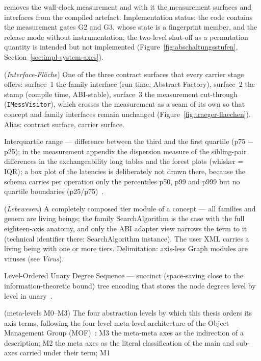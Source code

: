 \begin{description}
  removes the wall-clock measurement and with it the measurement surfaces and interfaces from the
  compiled artefact. Implementation status: the code contains the measurement gates G2 and G3,
  whose state is a fingerprint member, and the release mode without instrumentation; the two-level
  shut-off as a permutation quantity is intended but not implemented
  (Figure~\ref{fig:abschaltungsstufen}, Section~\ref{sec:impl-system-axes}).
  \item[Interface surface] (\emph{Interface-Fläche}) One of the three contract surfaces that every
  carrier stage offers: surface~1 the family interface (run time, Abstract Factory), surface~2 the
  stamp (compile time, ABI-stable), surface~3 the measurement cut-through (\texttt{IMessVisitor}),
  which crosses the measurement as a seam of its own so that concept and family interfaces remain
  unchanged (Figure~\ref{fig:traeger-flaechen}). Alias: contract surface, carrier surface.
  \item[IQR] Interquartile range --- difference between the third and the first quartile (p75 $-$
  p25); in the measurement appendix the dispersion measure of the sibling-pair differences in the
  exchangeability long tables and the forest plots (whisker = IQR); a box plot of the latencies is
  deliberately not drawn there, because the schema carries per operation only the percentiles p50,
  p99 and p999 but no quartile boundaries (p25/p75)~\cite{mcgill1978boxplots}.
  \item[Living being] (\emph{Lebewesen}) A completely composed tier module of a concept --- all
  families and genera are living beings; the family SearchAlgorithm is the case with the full eighteen-axis anatomy,
  and only the ABI adapter view narrows the term to it (technical identifier there: SearchAlgorithm
  instance). The user XML carries a living being with one or more tiers. Delimitation: axis-less
  Graph modules are viruses (see \emph{Virus}).
  \item[LOUDS] Level-Ordered Unary Degree Sequence --- succinct (space-saving close to the
  information-theoretic bound) tree encoding that stores the node degrees level by level in
  unary~\cite{jacobson1989louds}.
  \item[M0--M3] (meta-levels M0--M3) The four abstraction levels by which this thesis orders its
  axis terms, following the four-level meta-level architecture of the Object Management Group
  (MOF)~\cite{omg2016mof}: M3 the meta-meta axes as the indirection of a description; M2 the meta
  axes as the literal classification of the main and sub-axes carried under their term; M1

\end{description}
